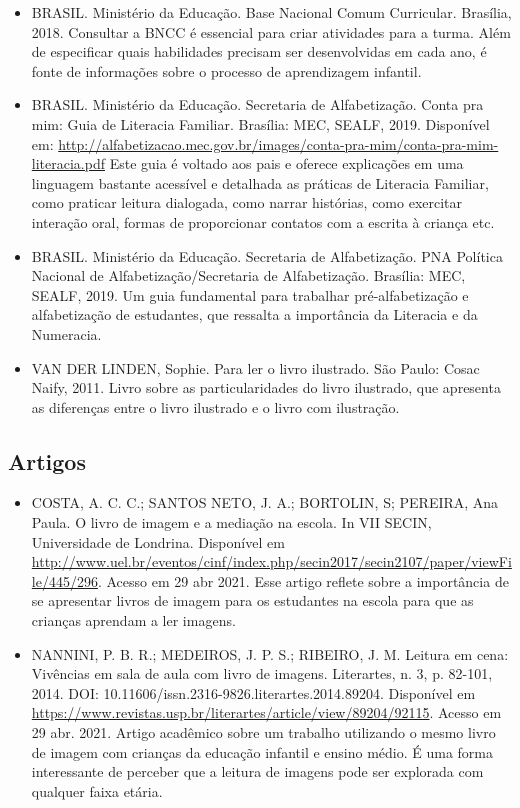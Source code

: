 \documentclass[11pt]{extarticle}
\begin{document}
\begin{itemize}
\item BRASIL. Ministério da Educação. Base Nacional Comum Curricular. Brasília, 2018.
Consultar a BNCC é essencial para criar atividades para a turma. Além de especificar 
quais habilidades precisam ser desenvolvidas em cada ano, é fonte de informações sobre 
o processo de aprendizagem infantil. 

\item BRASIL. Ministério da Educação. Secretaria de Alfabetização. Conta pra mim: Guia de Literacia Familiar. 
Brasília: MEC, SEALF, 2019. Disponível em: \url{http://alfabetizacao.mec.gov.br/images/conta-pra-mim/conta-pra-mim-literacia.pdf}
Este guia é voltado aos pais e oferece explicações em uma linguagem bastante acessível e detalhada as práticas de Literacia Familiar, 
como praticar leitura dialogada, como narrar histórias, como exercitar interação oral, formas de proporcionar contatos com a escrita à criança etc. 
 
\item BRASIL. Ministério da Educação. Secretaria de Alfabetização. PNA Política Nacional de Alfabetização/Secretaria 
de Alfabetização. Brasília: MEC, SEALF, 2019.
Um guia fundamental para trabalhar pré-alfabetização e alfabetização de estudantes, que ressalta a importância da Literacia e da Numeracia. 

\item VAN DER LINDEN, Sophie. Para ler o livro ilustrado. São Paulo: Cosac Naify, 2011.
Livro sobre as particularidades do livro ilustrado, que apresenta as diferenças entre o livro ilustrado e o livro com ilustração. 
\end{itemize}

\subsection{Artigos}

\begin{itemize}
\item COSTA, A. C. C.; SANTOS NETO, J. A.; BORTOLIN, S; PEREIRA, Ana Paula. O livro de imagem e a mediação na escola. 
In VII SECIN, Universidade de Londrina. Disponível em \url{http://www.uel.br/eventos/cinf/index.php/secin2017/secin2107/paper/viewFile/445/296}. 
Acesso em 29 abr 2021. 
Esse artigo reflete sobre a importância de se apresentar livros de imagem para os estudantes na escola para que as crianças aprendam a ler imagens. 

\item NANNINI, P. B. R.; MEDEIROS, J. P. S.; RIBEIRO, J. M. Leitura em cena: Vivências em sala de aula com livro de imagens. 
Literartes, n. 3, p. 82-101, 2014. DOI: 10.11606/issn.2316-9826.literartes.2014.89204. 
Disponível em \url{https://www.revistas.usp.br/literartes/article/view/89204/92115}. Acesso em 29 abr. 2021. 
Artigo acadêmico sobre um trabalho utilizando o mesmo livro de imagem com crianças da educação infantil e ensino médio. 
É uma forma interessante de perceber que a leitura de imagens pode ser explorada com qualquer faixa etária. 
\end{itemize}

% 
\end{document}
